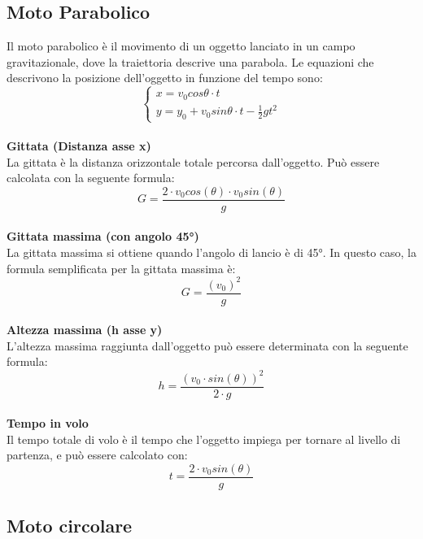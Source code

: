 \documentclass{article}
\begin{document}
\subsection{Moto Parabolico}
Il moto parabolico è il movimento di un oggetto lanciato in un campo gravitazionale, dove la traiettoria descrive una parabola. Le equazioni che descrivono la posizione dell'oggetto in funzione del tempo sono:
\[
\begin{cases}
    x = v_0 cos \theta \cdot t \\
    y = y_0 + v_0 sin \theta \cdot t - \frac{1}{2}g t^2
\end{cases}
\]
\\
\textbf{Gittata (Distanza asse x)}\\
La gittata è la distanza orizzontale totale percorsa dall'oggetto. Può essere calcolata con la seguente formula:
\[
    G = \frac{2\cdot v_0 cos(\theta) \cdot v_0 sin(\theta)}{g}
\]
\\
\textbf{Gittata massima (con angolo 45°)}\\
La gittata massima si ottiene quando l'angolo di lancio è di 45°. In questo caso, la formula semplificata per la gittata massima è:
\[
    G = \frac{(v_0)^2}{g}
\]
\\
\textbf{Altezza massima (h asse y)}\\
L'altezza massima raggiunta dall'oggetto può essere determinata con la seguente formula:
\[
    h = \frac{(v_0 \cdot sin(\theta))^2}{2 \cdot g}
\]
\\
\textbf{Tempo in volo}\\
Il tempo totale di volo è il tempo che l'oggetto impiega per tornare al livello di partenza, e può essere calcolato con:
\[
    t = \frac{2 \cdot v_0 sin(\theta)}{g}
\]
\subsection{Moto circolare}
\end{document}
